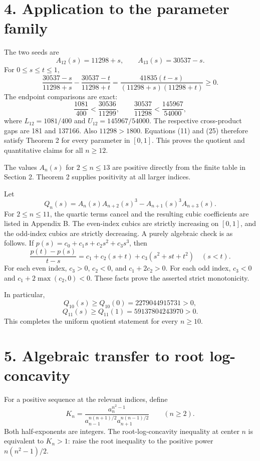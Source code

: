 \documentclass[
  11pt,
  a4paper,
]{article}
\begin{document}
\section{4. Application to the parameter
family}\label{application-to-the-parameter-family}

The two seeds are \[
A_{12}(s)=11298+s,\qquad A_{13}(s)=30537-s.
\] For \(0\le s\le t\le1\), \[
\frac{30537-s}{11298+s}-\frac{30537-t}{11298+t}
=\frac{41835(t-s)}{(11298+s)(11298+t)}\ge0.
\] The endpoint comparisons are exact: \[
\frac{1081}{400}<\frac{30536}{11299},\qquad
\frac{30537}{11298}<\frac{145967}{54000},
\tag{25}
\] where \(L_{12}=1081/400\) and \(U_{12}=145967/54000\). The respective
cross-product gaps are 181 and 137166. Also \(11298>1800\). Equations
(11) and (25) therefore satisfy Theorem 2 for every parameter in
\([0,1]\). This proves the quotient and quantitative claims for all
\(n\ge12\).

The values \(A_n(s)\) for \(2\le n\le13\) are positive directly from the
finite table in Section 2. Theorem 2 supplies positivity at all larger
indices.

Let \[
Q_n(s)=A_n(s)A_{n+2}(s)^3-A_{n+1}(s)^3A_{n+3}(s).
\tag{26}
\] For \(2\le n\le11\), the quartic terms cancel and the resulting cubic
coefficients are listed in Appendix B. The even-index cubics are
strictly increasing on \([0,1]\), and the odd-index cubics are strictly
decreasing. A purely algebraic check is as follows. If
\(p(s)=c_0+c_1s+c_2s^2+c_3s^3\), then \[
\frac{p(t)-p(s)}{t-s}=c_1+c_2(s+t)+c_3(s^2+st+t^2)
\quad(s<t).
\] For each even index, \(c_3>0\), \(c_2<0\), and \(c_1+2c_2>0\). For
each odd index, \(c_3<0\) and \(c_1+2\max(c_2,0)<0\). These facts prove
the asserted strict monotonicity.

In particular, \[
Q_{10}(s)\ge Q_{10}(0)=2279044915731>0,
\] \[
Q_{11}(s)\ge Q_{11}(1)=59137804243970>0.
\] This completes the uniform quotient statement for every \(n\ge10\).

\section{5. Algebraic transfer to root
log-concavity}\label{algebraic-transfer-to-root-log-concavity}

For a positive sequence at the relevant indices, define \[
K_n=\frac{a_n^{n^2-1}}
{a_{n-1}^{n(n+1)/2}a_{n+1}^{n(n-1)/2}}
\qquad(n\ge2).
\] Both half-exponents are integers. The root-log-concavity inequality
at center \(n\) is equivalent to \(K_n>1\): raise the root inequality to
the positive power \(n(n^2-1)/2\).
\end{document}
